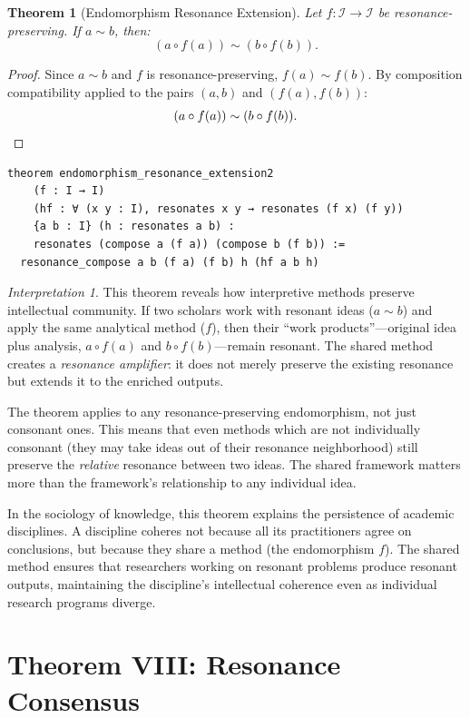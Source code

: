 \documentclass[11pt,openany]{book}
\theoremstyle{definition}
\theoremstyle{plain}
\newtheorem{theorem}[axiom]{Theorem}
\theoremstyle{remark}
\newtheorem{interpretation}[axiom]{Interpretation}
\newcommand{\IS}{\mathcal{I}}               %
\newcommand{\compose}{\circ}                 %
\newcommand{\res}{\sim}                      %
\begin{document}
\begin{theorem}[Endomorphism Resonance Extension]
\label{thm:key-endo-res}
Let $f : \IS \to \IS$ be resonance-preserving. If $a \res b$, then:
\[
(a \compose f(a)) \res (b \compose f(b)).
\]
\end{theorem}

\begin{proof}
Since $a \res b$ and $f$ is resonance-preserving, $f(a) \res f(b)$. By composition compatibility applied to the pairs $(a, b)$ and $(f(a), f(b))$:
\[
(a \compose f(a)) \res (b \compose f(b)). \qedhere
\]
\end{proof}

\begin{lstlisting}
theorem endomorphism_resonance_extension2
    (f : I → I)
    (hf : ∀ (x y : I), resonates x y → resonates (f x) (f y))
    {a b : I} (h : resonates a b) :
    resonates (compose a (f a)) (compose b (f b)) :=
  resonance_compose a b (f a) (f b) h (hf a b h)
\end{lstlisting}

\begin{interpretation}
This theorem reveals how interpretive methods preserve intellectual community. If two scholars work with resonant ideas ($a \res b$) and apply the same analytical method ($f$), then their ``work products''---original idea plus analysis, $a \compose f(a)$ and $b \compose f(b)$---remain resonant. The shared method creates a \emph{resonance amplifier}: it does not merely preserve the existing resonance but extends it to the enriched outputs.

The theorem applies to any resonance-preserving endomorphism, not just consonant ones. This means that even methods which are not individually consonant (they may take ideas out of their resonance neighborhood) still preserve the \emph{relative} resonance between two ideas. The shared framework matters more than the framework's relationship to any individual idea.

In the sociology of knowledge, this theorem explains the persistence of academic disciplines. A discipline coheres not because all its practitioners agree on conclusions, but because they share a method (the endomorphism $f$). The shared method ensures that researchers working on resonant problems produce resonant outputs, maintaining the discipline's intellectual coherence even as individual research programs diverge.
\end{interpretation}

\section{Theorem VIII: Resonance Consensus}
\end{document}
